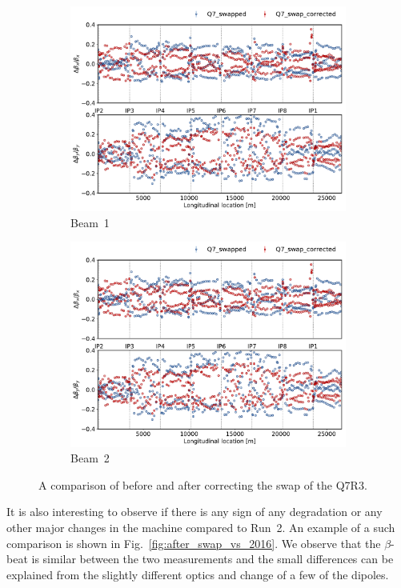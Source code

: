 \documentclass[a4paper]{cernatsnote}
\begin{document}
\begin{figure}[ht]
\begin{subfigure}{.5\textwidth}
  \centering
  \includegraphics[width=.8\linewidth]{plots/beam1/beta_beat_before_after_swap.pdf}  
  \caption{Beam~1}
\end{subfigure}
\begin{subfigure}{.5\textwidth}
  \centering
  \includegraphics[width=.8\linewidth]{plots/beam1/beta_beat_before_after_swap.pdf}  
  \caption{Beam~2}
\end{subfigure}
\caption{A comparison of before and after correcting the swap of the Q7R3.}
\label{fig:before_after_swap}
\end{figure}

It is also interesting to observe if there is any sign of any degradation or any other major changes in the machine compared to Run~2. An example of a such comparison is shown in Fig.~\ref{fig:after_swap_vs_2016}. We observe that the $\beta$-beat is similar between the two measurements and the small differences can be explained from the slightly different optics and change of a few of the dipoles. 
\end{document}
